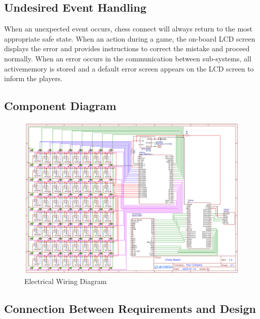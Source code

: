 \documentclass[12pt, titlepage]{article}
\begin{document}
\subsection{Undesired Event Handling}
When an unexpected event occurs, chess connect will always return to the most 
appropriate safe state. When an action during a game, the on-board LCD screen 
displays the error and provides instructions to correct the mistake and proceed 
normally. When an error occurs in the communication between sub-systems, all 
activememory is stored and a default error screen appears on the LCD screen to 
inform the players.

\subsection{Component Diagram}

\begin{figure}[H]
  \begin{center}
    \includegraphics[scale=0.45]{wiring_diagram.pdf}
    \caption{Electrical Wiring Diagram}
    \label{Fig_Wiring_Dgm} 
  \end{center}
\end{figure}

\subsection{Connection Between Requirements and Design} \label{SecConnection}
\end{document}
